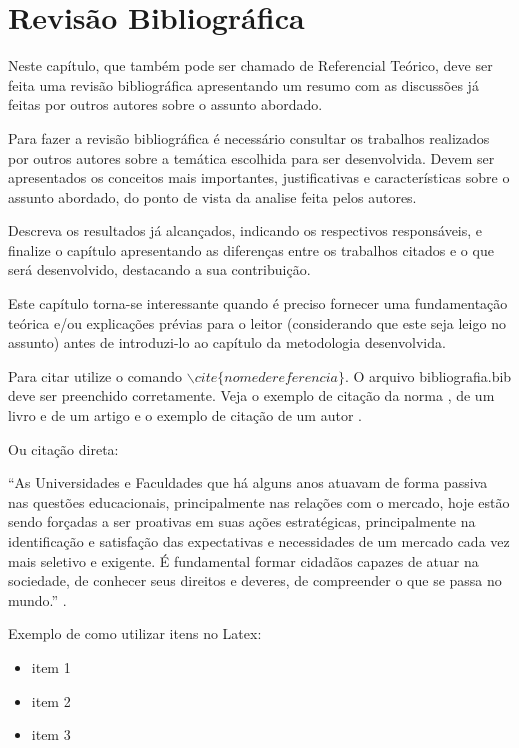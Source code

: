 \chapter{Revisão Bibliográfica} \label{RevisaoBibliografica}

Neste capítulo, que também pode ser chamado de Referencial Teórico, deve ser feita uma revisão bibliográfica apresentando um resumo com as discussões já feitas por outros autores sobre o assunto abordado.

Para fazer a revisão bibliográfica é necessário consultar os trabalhos  realizados por outros autores sobre a temática escolhida para ser desenvolvida. Devem ser apresentados os conceitos mais importantes, justificativas e características sobre o assunto abordado, do ponto de vista da analise feita pelos autores. 

Descreva os resultados já alcançados, indicando os respectivos responsáveis, e finalize o capítulo apresentando as diferenças entre os trabalhos citados e o que será desenvolvido, destacando a sua contribuição.

Este capítulo torna-se interessante quando é preciso fornecer uma fundamentação teórica e/ou explicações prévias para o leitor (considerando que este seja leigo no assunto) antes de introduzi-lo ao capítulo da metodologia desenvolvida.

Para citar utilize o comando $\backslash cite\{nomedereferencia\} $. O arquivo bibliografia.bib deve ser preenchido corretamente. Veja o exemplo de citação da norma \cite{NBR10520}, de um livro \cite{ogata} e de um artigo \cite{sbse} e o exemplo de citação de um autor .

Ou citação direta:

\begin{flushright}
\noindent
\parbox{\linewidth-4cm}{
“As Universidades e Faculdades que há alguns anos atuavam de forma passiva nas questões educacionais, principalmente nas relações com o mercado, hoje estão sendo forçadas a ser proativas em suas ações estratégicas, principalmente na identificação e satisfação das expectativas e necessidades de um mercado cada vez mais seletivo e exigente. É fundamental formar cidadãos capazes de atuar na sociedade, de conhecer seus direitos e deveres, de compreender o que se passa no mundo.”  \cite{neves2002}.
}
\end{flushright}


Exemplo de como utilizar itens no Latex:

\begin{itemize}\itemsep5pt
    \item item 1
    \item item 2
    \item item 3
\end{itemize}








